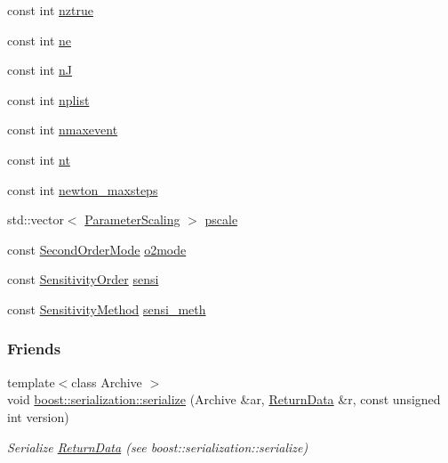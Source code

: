 \begin{DoxyCompactItemize}
\item 
const int \mbox{\hyperlink{classamici_1_1_return_data_a9a451378ba5572ef7a3fd4dd89e1c227}{nztrue}}
\item 
const int \mbox{\hyperlink{classamici_1_1_return_data_a07d5274358ec39bfec473cd212a3cb78}{ne}}
\item 
const int \mbox{\hyperlink{classamici_1_1_return_data_a0d2f49d2b15b08628451261e52f56e4f}{nJ}}
\item 
const int \mbox{\hyperlink{classamici_1_1_return_data_a2375af1667e955ed7a61ade0868f735a}{nplist}}
\item 
const int \mbox{\hyperlink{classamici_1_1_return_data_a48832d4f3a37c4fd75cc7f4ef578d1b1}{nmaxevent}}
\item 
const int \mbox{\hyperlink{classamici_1_1_return_data_a21dcbe77c07eeefce79fcacdbe5f1262}{nt}}
\item 
const int \mbox{\hyperlink{classamici_1_1_return_data_a871e64bbfbd5881a86f21aaff42c3dec}{newton\+\_\+maxsteps}}
\item 
std\+::vector$<$ \mbox{\hyperlink{namespaceamici_a42f062082226e9284c201d9eab71a3a0}{Parameter\+Scaling}} $>$ \mbox{\hyperlink{classamici_1_1_return_data_a5d1c7237dc998202fe1b3393b50f77ce}{pscale}}
\item 
const \mbox{\hyperlink{namespaceamici_a2d77779286167d5603a870bf9f6c21ba}{Second\+Order\+Mode}} \mbox{\hyperlink{classamici_1_1_return_data_acc235cad50283f7891e2d834f1cbeb90}{o2mode}}
\item 
const \mbox{\hyperlink{namespaceamici_aaa03ec2f8c4d5323b98d71134a462fda}{Sensitivity\+Order}} \mbox{\hyperlink{classamici_1_1_return_data_ae273fd99697cf0308e7471d822c22d7f}{sensi}}
\item 
const \mbox{\hyperlink{namespaceamici_aa0fa493529f6872e7e776b91fbbf38f9}{Sensitivity\+Method}} \mbox{\hyperlink{classamici_1_1_return_data_ab761d3023398d7f741a0cfc342dc29f5}{sensi\+\_\+meth}}
\end{DoxyCompactItemize}
\subsubsection*{Friends}
\begin{DoxyCompactItemize}
\item 
{\footnotesize template$<$class Archive $>$ }\\void \mbox{\hyperlink{classamici_1_1_return_data_af3646925990e46131d1bc92b5a7c0dc4}{boost\+::serialization\+::serialize}} (Archive \&ar, \mbox{\hyperlink{classamici_1_1_return_data}{Return\+Data}} \&r, const unsigned int version)
\begin{DoxyCompactList}\small\item\em Serialize \mbox{\hyperlink{classamici_1_1_return_data}{Return\+Data}} (see boost\+::serialization\+::serialize) \end{DoxyCompactList}\end{DoxyCompactItemize}


